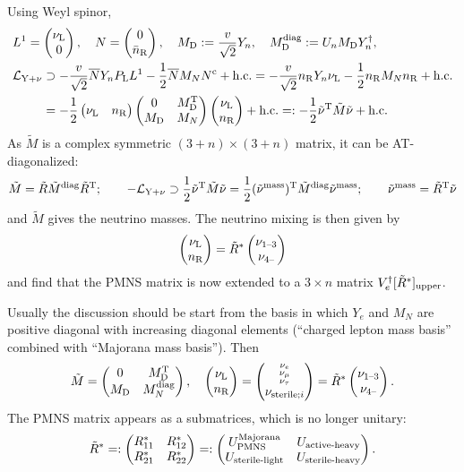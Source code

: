 \documentclass[CheatSheet]{subfiles}
\newcommand\MD[1][]{M_{\mathrm{D}#1}}
\newcommand\MN[1][]{M_{N#1}}
\begin{document}
Using Weyl spinor,
\begin{align}
& L^1 = \pmat{\nuL\\0},\quad
 N   = \pmat{0\\\bnR},\quad
 \MD := \frac{v}{\sqrt2}Y_n,\quad
 \MD\wdiag := U_n \MD Y_n^\dagger,\\
&\label{eq:MajoranaNuLag}
 \mathcal L\w{Y+\nu} 
\supset
 -\frac{v}{\sqrt2}\overline{N}Y_n \PL L^1 - \frac{1}{2}\overline{N}\MN N^\cc + \text{h.c.}
=
 -\frac{v}{\sqrt2}\nR Y_n \nuL - \frac{1}{2}\nR \MN\nR + \text{h.c.}\\
&\phantom{ \mathcal L\w{Y+\nu}}
=-\frac12\pmat{\nuL & \nR}\pmat{0 & \MD^\TT \\ \MD & \MN} \pmat{\nuL \\ \nR} + \text{h.c.} =: -\frac12\tilde\nu^\TT \tilde M\tilde \nu+\text{h.c.}
\end{align}
As $\tilde M$ is a complex symmetric $(3+n)\times(3+n)$ matrix, it can be AT-diagonalized:
\begin{equation}
  \tilde M = \tilde R \tilde M^{\text{diag}} \tilde R^{\mathrm{T}};
\qquad
-\mathcal L_{\mathrm{Y+\nu}}\supset
\frac12\tilde \nu^{\mathrm{T}} \tilde M\tilde\nu
=\frac12(\tilde\nu^{\text{mass}})^{\mathrm{T}} \tilde M^{\text{diag}} \tilde\nu^{\text{mass}};\qquad \tilde\nu^{\text{mass}} =\tilde R^{\mathrm{T}}\tilde\nu
\end{equation}
and $\tilde M$ gives the neutrino masses.
The neutrino mixing is then given by
\begin{align}
 \begin{pmatrix}\nu_{\mathrm{L}}\\n_{\mathrm{R}}\end{pmatrix} = \tilde R^*\begin{pmatrix}\nu_{1\text{--}3} \\ \nu_{4\text{--}}\end{pmatrix}
\end{align}
and find that the PMNS matrix is now extended to a $3\times n$ matrix $V_e^\dagger [\tilde R^*]_{\mathrm{upper}}$.

Usually the discussion should be start from the basis in which $Y_e$ and $M_N$ are positive diagonal with increasing diagonal elements (``charged lepton mass basis'' combined with ``Majorana mass basis'').
Then
\begin{equation}
\tilde M = \pmat{0 & \MD^\TT \\ \MD & \MN\wdiag},
\quad
\pmat{\nuL\\\nR}
=
\pmat{\begin{smallmatrix}\nu_e\\\nu_\mu\\\nu_\tau\end{smallmatrix}\\\nu_{\text{sterile};i}}
=\tilde R^*\pmat{\nu_{1\TO3}\\\nu_{4\TO}}.
\end{equation}
The PMNS matrix appears as a submatrices, which is no longer unitary:
\begin{equation}
\tilde R^*
=:
\begin{pmatrix} R_{11}^* & R_{12}^* \\ R_{21}^* & R_{22}^*\end{pmatrix}
=:
\begin{pmatrix}U_{\mathrm{PMNS}}^{\text{Majorana}} & U_{\text{active-heavy}}\\
U_{\text{sterile-light}} & U_{\text{sterile-heavy}}
\end{pmatrix}.
\end{equation}
\end{document}
